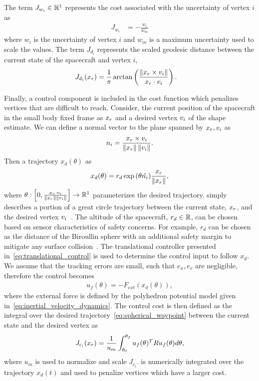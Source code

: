 The term \( J_{w_i} \in \mathbb{R}^1 \) represents the cost associated with the uncertainty of vertex \( i \) as
\begin{align}\label{eq:weight_cost}
    J_{w_i} &= - \frac{w_i}{w_m}
\end{align}
where \( w_i \) is the uncertainty of vertex \( i \) and \( w_m \) is a maximum uncertainty used to scale the values.
The term \( J_{d_i} \) represents the scaled geodesic distance between the current state of the spacecraft and vertex \( i \),
\begin{align}\label{eq:distance_cost}
    J_{d_i}(x_r) &= \frac{1}{\pi} \arctan \left(  \frac{\left\| x_r \times v_i \right\|}{x_r \cdot v_i} \right).
\end{align}

Finally, a control component is included in the cost function which penalizes vertices that are difficult to reach.
Consider, the current position of the spacecraft in the small body fixed frame as \( x_r\) and a desired vertex \( v_i \) of the shape estimate.
We can define a normal vector to the plane spanned by \( x_r, v_i \) as
\begin{align}\label{eq:normal_to_plane}
    n_i = \frac{x_r \times v_i}{\left\| x_r \right\| \left\| v_i \right\|}.
\end{align}
Then a trajectory \( x_d(\theta) \) as
\begin{align}\label{eq:spherical_waypoint}
    x_d(\theta) = r_d \exp{\ensuremath{\left( \theta \hat{n_i} \right)} } \frac{x_r}{\left\| x_r \right\|},
\end{align}
where \( \theta : \left[ 0, \frac{x_r \cdot v_i}{\left\| x_r \right\|\left\| v_i \right\|} \right] \to \mathbb{R}^1\) parameterizes the desired trajectory.
 simply describes a portion of a great circle trajectory between the current state, \( x_r \), and the desired vertex \( v_i \)~\cite{chen2016}.
The altitude of the spacecraft, \( r_d \in \mathbb{R} \), can be chosen based on sensor characteristics of safety concerns.
For example, \( r_d \) can be chosen as the distance of the Biroullin sphere with an additional safety margin to mitigate any surface collision~\cite{scheeres2012a}.
The translational controller presented in~\cref{eq:translational_control} is used to determine the control input to follow \( x_d\).
We assume that the tracking errors are small, such that \( e_x, e_v \) are negligible, therefore the control becomes
\begin{align}\label{eq:tracking_control_cost}
    u_f(\theta) = -F_{ext}(x_d(\theta)), 
\end{align}
where the external force is defined by the polyhedron potential model given in~\cref{eq:inertial_velocity_dynamics}.
The control cost is then defined as the integral over the desired trajectory~\cref{eq:spherical_waypoint} between the current state and the desired vertex as
\begin{align}\label{eq:control_cost}
    J_{c_i}(x_r) = \frac{1}{u_m} \int_{\theta_0}^{\theta_f} u_f(\theta)^T R u_f(\theta) d\theta,
\end{align}
where \( u_m \) is used to normalize and scale \( J_{c_i} \).
 is numerically integrated over the trajectory \( x_d(t) \) and used to penalize vertices which have a larger cost.

